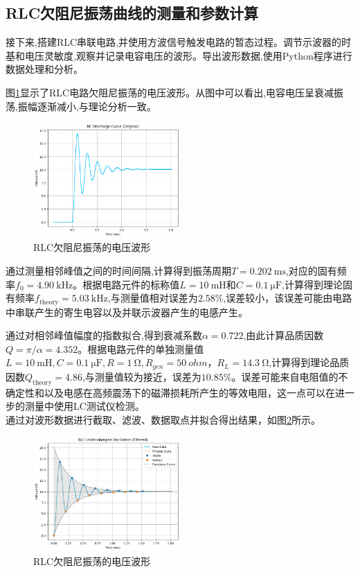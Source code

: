 \documentclass[UTF8]{ctexart}
\begin{document}
\subsection{RLC欠阻尼振荡曲线的测量和参数计算}

接下来,搭建RLC串联电路,并使用方波信号触发电路的暂态过程。调节示波器的时基和电压灵敏度,观察并记录电容电压的波形。导出波形数据,使用Python程序进行数据处理和分析。

图\ref{fig:rlc_oscillation}显示了RLC电路欠阻尼振荡的电压波形。从图中可以看出,电容电压呈衰减振荡,振幅逐渐减小,与理论分析一致。

\begin{figure}[htbp]
    \centering
    \includegraphics[width=0.5\textwidth]{rlc_oscillation.png}
    \caption{RLC欠阻尼振荡的电压波形}
    \label{fig:rlc_oscillation}
\end{figure}

通过测量相邻峰值之间的时间间隔,计算得到振荡周期$T = \SI{0.202}{\milli\second}$,对应的固有频率$f_0 = \SI{4.90}{\kilo\hertz}$。根据电路元件的标称值$L = \SI{10}{\milli\henry}$和$C = \SI{0.1}{\micro\farad}$,计算得到理论固有频率$f_{\text{theory}} = \SI{5.03}{\kilo\hertz}$,与测量值相对误差为$2.58\%$,误差较小，该误差可能由电路中串联产生的寄生电容以及并联示波器产生的电感产生。

通过对相邻峰值幅度的指数拟合,得到衰减系数$\alpha = 0.722$,由此计算品质因数$Q = \pi/\alpha = 4.352$。根据电路元件的单独测量值$L=\SI{10}{\milli\henry},C=\SI{0.1}{\micro\farad},R=\SI{1}{\ohm},R_{gen}=\SI{50}{ohm}，R_{L}=\SI{14.3}{\ohm}$,计算得到理论品质因数$Q_{\text{theory}} = 4.86$,与测量值较为接近，误差为$10.85\%$。误差可能来自电阻值的不确定性和以及电感在高频震荡下的磁滞损耗所产生的等效电阻，这一点可以在进一步的测量中使用LC测试仪检测。
\\ 通过对波形数据进行截取、滤波、数据取点并拟合得出结果，如图\ref{fig:rlc_oscillation_processed}所示。
\begin{figure}[htbp]
    \centering
    \includegraphics[width=0.5\textwidth]{rlc_oscillation_processed.png}
    \caption{RLC欠阻尼振荡的电压波形}
    \label{fig:rlc_oscillation_processed}
\end{figure}
\newpage
\end{document}
